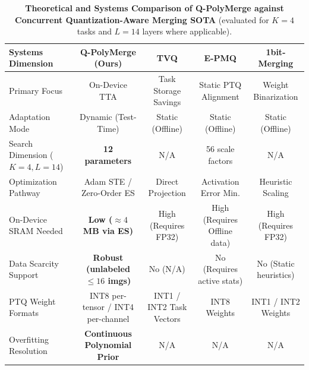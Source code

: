 \begin{table}[t]
\centering
\caption{\textbf{Theoretical and Systems Comparison of Q-PolyMerge against Concurrent Quantization-Aware Merging SOTA} (evaluated for $K=4$ tasks and $L=14$ layers where applicable).}
\label{tab:sota_comparison}
\vskip 0.15in
\begin{scriptsize}
\begin{sc}
\begin{tabular}{lcccc}
\toprule
Systems Dimension & \textbf{Q-PolyMerge} (Ours) & \textbf{TVQ} \cite{tvq2025} & \textbf{E-PMQ} \cite{epmq2026} & \textbf{1bit-Merging} \cite{onebitmerging2025} \\
\midrule
Primary Focus & On-Device TTA & Task Storage Savings & Static PTQ Alignment & Weight Binarization \\
Adaptation Mode & Dynamic (Test-Time) & Static (Offline) & Static (Offline) & Static (Offline) \\
Search Dimension ($K=4, L=14$) & \textbf{12 parameters} & N/A & 56 scale factors & N/A \\
Optimization Pathway & Adam STE / Zero-Order ES & Direct Projection & Activation Error Min. & Heuristic Scaling \\
On-Device SRAM Needed & \textbf{Low ($\approx 4$ MB via ES)} & High (Requires FP32) & High (Requires Offline data) & High (Requires FP32) \\
Data Scarcity Support & \textbf{Robust (unlabeled $\le 16$ imgs)} & No (N/A) & No (Requires active stats) & No (Static heuristics) \\
PTQ Weight Formats & INT8 per-tensor / INT4 per-channel & INT1 / INT2 Task Vectors & INT8 Weights & INT1 / INT2 Weights \\
Overfitting Resolution & \textbf{Continuous Polynomial Prior} & N/A & N/A & N/A \\
\bottomrule
\end{tabular}
\end{sc}
\end{scriptsize}
\end{table}

